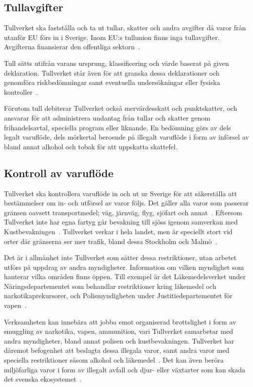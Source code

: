 \subsection{Tullavgifter}

Tullverket ska fastställa och ta ut tullar, skatter och andra avgifter då
varor från utanför EU förs in i Sverige. Inom EU:s tullunion finns inga
tullavgifter. Avgifterna finansierar den offentliga sektorn~\cite{tull}.

Tull sätts utifrån varans ursprung, klassificering och värde baserat på given
deklaration. Tullverket står även för att granska dessa deklarationer och
genomföra riskbedömningar samt eventuella undersökningar eller fysiska
kontroller~\cite{verksamhet}.

Förutom tull debiterar Tullverket också mervärdesskatt och punktskatter,
och ansvarar för att administrera undantag från tullar och skatter genom
frihandelsavtal, speciella program eller liknande.
%
En bedömning görs av dels legalt varuflöde, dels mörkertal beroende på
illegalt varuflöde i form av införsel av bland annat alkohol och tobak
för att uppskatta skattefel.

\subsection{Kontroll av varuflöde}

Tullverket ska kontrollera varuflöde in och ut ur Sverige för att säkerställa
att bestämmelser om in- och utförsel av varor följs. Det gäller alla varor som
passerar gränsen oavsett transportmedel; väg, järnväg, flyg, sjöfart och
annat~\cite{varuflodet}.
%
Eftersom Tullverket inte har egna fartyg går bevakning till sjöss igenom
samverkan med Kustbevakningen~\cite{kustbevakningen}.
%
Tullverket verkar i hela landet, men är speciellt stort vid orter där gränserna
ser mer trafik, bland dessa Stockholm och Malmö~\cite{krisinformation}.

Det är i allmänhet inte Tullverket som sätter dessa restriktioner, utan arbetet
utförs på uppdrag av andra myndigheter. Information om vilken myndighet som
hanterar vilka områden finns öppen. Till exempel är det Läkemedelsverket under
Näringsdepartementet som behandlar restriktioner kring läkemedel och
narkotikaprekursorer, och Polismyndigheten under Justitiedepartementet för
vapen~\cite{kontroller}.

Verksamheten kan innebära att jobba emot organiserad brottslighet i form av
smuggling av narkotika, vapen, ammunition, vari Tullverket samarbetar med andra
myndigheter, bland annat polisen och kustbevakningen.
%
Tullverket har däremot befogenhet att beslagta dessa illegala varor, samt andra
varor med speciella restriktioner såsom alkohol och läkemedel~\cite{beslag}.
%
Det kan även beröra miljöfarliga varor i form av illegalt avfall och djur-
eller växtarter som kan skada det svenska ekosystemet~\cite{wikipedia}.

